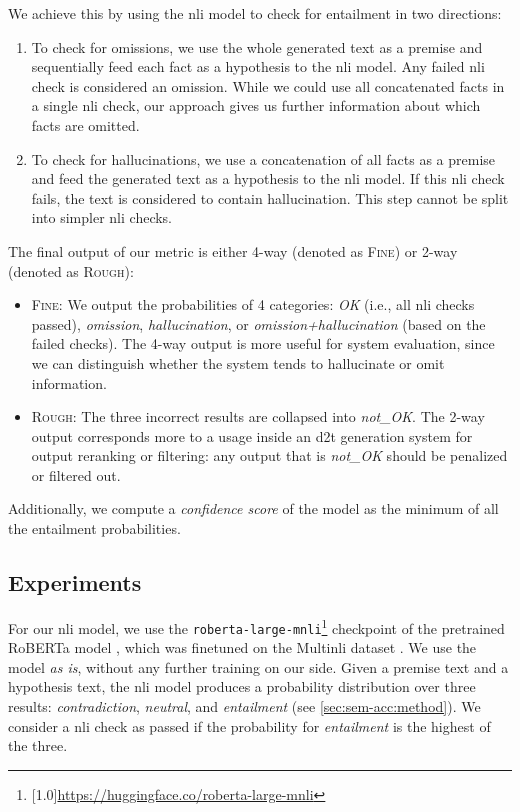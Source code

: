We achieve this by using the \ac{nli} model to check for entailment in two directions:
\begin{enumerate}
    \item To check for \textrm{omissions}, we use the whole generated text as a premise and sequentially feed each fact as a hypothesis to the \ac{nli} model. Any failed \ac{nli} check is considered an omission. While we could use all concatenated facts in a single \ac{nli} check, our approach gives us further information about which facts are omitted.
    \item To check for \textrm{hallucinations}, we use a concatenation of all facts as a premise and feed the generated text as a hypothesis to the \ac{nli} model. If this \ac{nli} check fails, the text is considered to contain hallucination. This step cannot be split into simpler \ac{nli} checks.
\end{enumerate}

The final output of our metric is either 4-way (denoted as \textsc{Fine}) or 2-way (denoted as \textsc{Rough}):
\begin{itemize}
    \item \textsc{Fine}: We output the probabilities of 4 categories: \emph{OK} (i.e., all \ac{nli} checks passed), \emph{omission}, \emph{hallucination}, or \emph{omission+hallucination} (based on the failed checks). The 4-way output is more useful for system evaluation, since we can distinguish whether the system tends to hallucinate or omit information.
    \item  \textsc{Rough}: The three incorrect results are collapsed into \emph{not\_OK}. The 2-way output corresponds more to a usage inside an \ac{d2t} generation system for output reranking or filtering: any output that is \emph{not\_OK} should be penalized or filtered out.
\end{itemize}

Additionally, we compute a \textit{confidence score} of the model as the minimum of all the entailment probabilities.


\subsection{Experiments}
\label{sec:sem-acc:experiments}
For our \ac{nli} model, we use the \texttt{roberta-large-mnli}\footnote{\scalebox{0.95}[1.0]{\url{https://huggingface.co/roberta-large-mnli}}} checkpoint of the pretrained RoBERTa model \cite{liuRoBERTaRobustlyOptimized2019}, which was finetuned on the Multi\ac{nli} dataset \cite{williams2018mnli}. We use the model \textit{as is}, without any further training on our side.
Given a premise text and a hypothesis text, the \ac{nli} model produces a probability distribution over three results: \textit{contradiction}, \textit{neutral},
and \textit{entailment} (see \autoref{sec:sem-acc:method}). We consider a \ac{nli} check as passed if the probability for \textit{entailment} is the highest of the three.



